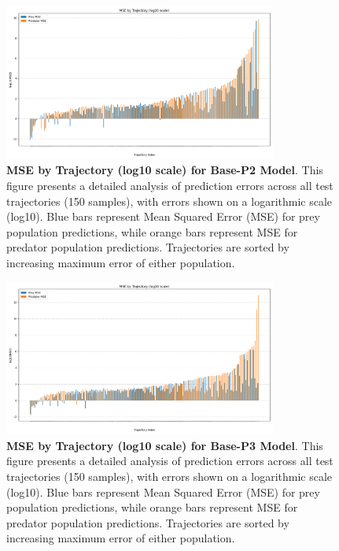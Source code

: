 \documentclass{article}
\begin{document}
\begin{figure} [H]
    \centering
    \includegraphics[width=0.8\textwidth]{trajectory_errors_p2}
    \caption{\textbf{MSE by Trajectory (log10 scale) for Base-P2 Model}. This figure presents a detailed analysis of prediction errors across all test trajectories (150 samples), with errors shown on a logarithmic scale (log10). Blue bars represent Mean Squared Error (MSE) for prey population predictions, while orange bars represent MSE for predator population predictions. Trajectories are sorted by increasing maximum error of either population.}
    \label{fig:error_lora_p2_trajectory}
\end{figure}

\begin{figure} [H]
    \centering
    \includegraphics[width=0.8\textwidth]{trajectory_errors_p3}
    \caption{\textbf{MSE by Trajectory (log10 scale) for Base-P3 Model}. This figure presents a detailed analysis of prediction errors across all test trajectories (150 samples), with errors shown on a logarithmic scale (log10). Blue bars represent Mean Squared Error (MSE) for prey population predictions, while orange bars represent MSE for predator population predictions. Trajectories are sorted by increasing maximum error of either population.}
    \label{fig:error_lora_p3_trajectory}
\end{figure}
\end{document}
